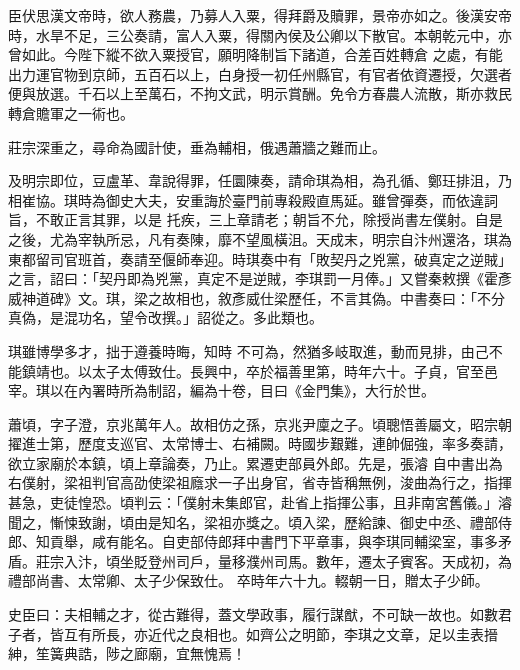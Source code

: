 \begin{pinyinscope}
 臣伏思漢文帝時，欲人務農，乃募人入粟，得拜爵及贖罪，景帝亦如之。後漢安帝時，水旱不足，三公奏請，富人入粟，得關內侯及公卿以下散官。本朝乾元中，亦曾如此。今陛下縱不欲入粟授官，願明降制旨下諸道，合差百姓轉倉
 之處，有能出力運官物到京師，五百石以上，白身授一初任州縣官，有官者依資遷授，欠選者便與放選。千石以上至萬石，不拘文武，明示賞酬。免令方春農人流散，斯亦救民轉倉贍軍之一術也。



 莊宗深重之，尋命為國計使，垂為輔相，俄遇蕭牆之難而止。



 及明宗即位，豆盧革、韋說得罪，任圜陳奏，請命琪為相，為孔循、鄭玨排沮，乃相崔協。琪時為御史大夫，安重誨於臺門前專殺殿直馬延。雖曾彈奏，而依違詞旨，不敢正言其罪，以是
 托疾，三上章請老；朝旨不允，除授尚書左僕射。自是之後，尤為宰執所忌，凡有奏陳，靡不望風橫沮。天成末，明宗自汴州還洛，琪為東都留司官班首，奏請至偃師奉迎。時琪奏中有「敗契丹之兇黨，破真定之逆賊」之言，詔曰：「契丹即為兇黨，真定不是逆賊，李琪罰一月俸。」又嘗秦敕撰《霍彥威神道碑》文。琪，梁之故相也，敘彥威仕梁歷任，不言其偽。中書奏曰：「不分真偽，是混功名，望令改撰。」詔從之。多此類也。



 琪雖博學多才，拙于遵養時晦，知時
 不可為，然猶多岐取進，動而見排，由己不能鎮靖也。以太子太傅致仕。長興中，卒於福善里第，時年六十。子貞，官至邑宰。琪以在內署時所為制詔，編為十卷，目曰《金門集》，大行於世。



 蕭頃，字子澄，京兆萬年人。故相仿之孫，京兆尹廩之子。頃聰悟善屬文，昭宗朝擢進士第，歷度支巡官、太常博士、右補闕。時國步艱難，連帥倔強，率多奏請，欲立家廟於本鎮，頃上章論奏，乃止。累遷吏部員外郎。先是，張濬
 自中書出為右僕射，梁祖判官高劭使梁祖廕求一子出身官，省寺皆稱無例，浚曲為行之，指揮甚急，吏徒惶恐。頃判云：「僕射未集郎官，赴省上指揮公事，且非南宮舊儀。」濬聞之，慚悚致謝，頃由是知名，梁祖亦獎之。頃入梁，歷給諫、御史中丞、禮部侍郎、知貢舉，咸有能名。自吏部侍郎拜中書門下平章事，與李琪同輔梁室，事多矛盾。莊宗入汴，頃坐貶登州司戶，量移濮州司馬。數年，遷太子賓客。天成初，為禮部尚書、太常卿、太子少保致仕。
 卒時年六十九。輟朝一日，贈太子少師。



 史臣曰：夫相輔之才，從古難得，蓋文學政事，履行謀猷，不可缺一故也。如數君子者，皆互有所長，亦近代之良相也。如齊公之明節，李琪之文章，足以圭表搢紳，笙簧典誥，陟之廊廟，宜無愧焉！



\end{pinyinscope}